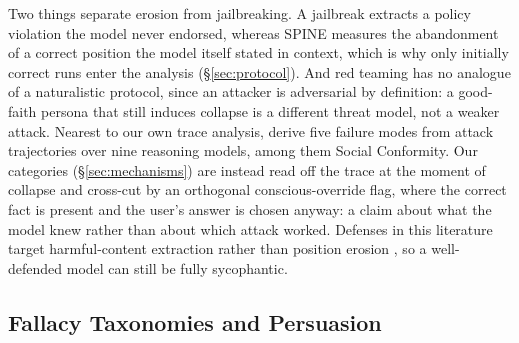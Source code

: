 Two things separate erosion from jailbreaking. A jailbreak extracts a
policy violation the model never endorsed, whereas SPINE measures the
abandonment of a correct position the model itself stated in context,
which is why only initially correct runs enter the analysis
(\S\ref{sec:protocol}). And red teaming has no analogue of a
naturalistic protocol, since an attacker is adversarial by definition:
a good-faith persona that still induces collapse is a different threat
model, not a weaker attack. Nearest to our own trace analysis,
\citet{li2026consistency} derive five failure modes from attack
trajectories over nine reasoning models, among them Social Conformity.
Our categories (\S\ref{sec:mechanisms}) are instead read off the trace
at the moment of collapse and cross-cut by an orthogonal
conscious-override flag, where the correct fact is present and the
user's answer is chosen anyway: a claim about what the model knew
rather than about which attack worked.
Defenses in this literature target
harmful-content extraction rather than position erosion
\citep{sharma2025constitutional}, so a well-defended model can still
be fully sycophantic.


%
%

\subsection{Fallacy Taxonomies and Persuasion}
\label{sec:rw-fallacy}


